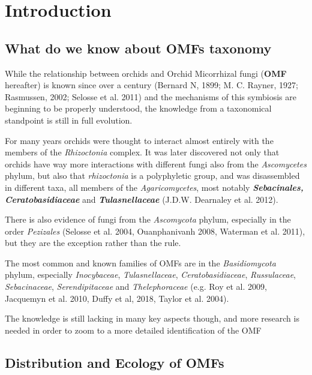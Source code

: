 

\part{Introduction}
\label{introduction}

\chapter{What do we know about OMFs taxonomy}
\label{whatdoweknowaboutomfstaxonomy}

While the relationship between orchids and Orchid Micorrhizal fungi (\textbf{OMF} hereafter) is known since over a century (Bernard N, 1899; M. C. Rayner, 1927; Rasmussen, 2002; Selosse et al. 2011) and the mechanisms of this symbiosis are beginning to be properly understood, the knowledge from a taxonomical standpoint is still in full evolution.

For many years orchids were thought to interact almost entirely with the members of the \emph{Rhizoctonia} complex. It was later discovered not only that orchids have way more interactions with different fungi also from the \emph{Ascomycetes} phylum, but also that \emph{rhizoctonia} is a polyphyletic group, and was disassembled in different taxa, all members of the \emph{Agaricomycetes}, most notably \textbf{\emph{Sebacinales, Ceratobasidiaceae}} and \textbf{\emph{Tulasnellaceae}} (J.D.W. Dearnaley et al. 2012).

There is also evidence of fungi from the \emph{Ascomycota} phylum, especially in the order \emph{Pezizales} (Selosse et al. 2004, Ouanphanivanh 2008, Waterman et al. 2011), but they are the exception rather than the rule.

The most common and known families of OMFs are in the \emph{Basidiomycota} phylum, especially \emph{Inocybaceae}, \emph{Tulasnellaceae}, \emph{Ceratobasidiaceae}, \emph{Russulaceae}, \emph{Sebacinaceae}, \emph{Serendipitaceae} and \emph{Thelephoraceae} (e.g. Roy et al. 2009, Jacquemyn et al. 2010, Duffy et al, 2018, Taylor et al. 2004).

The knowledge is still lacking in many key aspects though, and more research is needed in order to zoom to a more detailed identification of the OMF

\chapter{Distribution and Ecology of OMFs}
\label{distributionandecologyofomfs}

